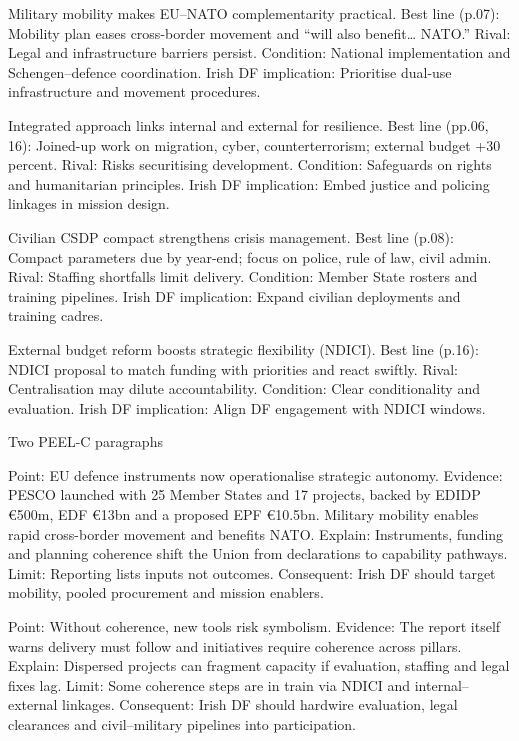 Military mobility makes EU–NATO complementarity practical.
Best line (p.07): Mobility plan eases cross-border movement and “will also benefit… NATO.”
Rival: Legal and infrastructure barriers persist.
Condition: National implementation and Schengen–defence coordination.
Irish DF implication: Prioritise dual-use infrastructure and movement procedures.

Integrated approach links internal and external for resilience.
Best line (pp.06, 16): Joined-up work on migration, cyber, counterterrorism; external budget +30 percent.
Rival: Risks securitising development.
Condition: Safeguards on rights and humanitarian principles.
Irish DF implication: Embed justice and policing linkages in mission design.

Civilian CSDP compact strengthens crisis management.
Best line (p.08): Compact parameters due by year-end; focus on police, rule of law, civil admin.
Rival: Staffing shortfalls limit delivery.
Condition: Member State rosters and training pipelines.
Irish DF implication: Expand civilian deployments and training cadres.

External budget reform boosts strategic flexibility (NDICI).
Best line (p.16): NDICI proposal to match funding with priorities and react swiftly.
Rival: Centralisation may dilute accountability.
Condition: Clear conditionality and evaluation.
Irish DF implication: Align DF engagement with NDICI windows.

Two PEEL-C paragraphs

Point: EU defence instruments now operationalise strategic autonomy.
Evidence: PESCO launched with 25 Member States and 17 projects, backed by EDIDP €500m, EDF €13bn and a proposed EPF €10.5bn. Military mobility enables rapid cross-border movement and benefits NATO.
Explain: Instruments, funding and planning coherence shift the Union from declarations to capability pathways.
Limit: Reporting lists inputs not outcomes.
Consequent: Irish DF should target mobility, pooled procurement and mission enablers.

Point: Without coherence, new tools risk symbolism.
Evidence: The report itself warns delivery must follow and initiatives require coherence across pillars.
Explain: Dispersed projects can fragment capacity if evaluation, staffing and legal fixes lag.
Limit: Some coherence steps are in train via NDICI and internal–external linkages.
Consequent: Irish DF should hardwire evaluation, legal clearances and civil–military pipelines into participation.

